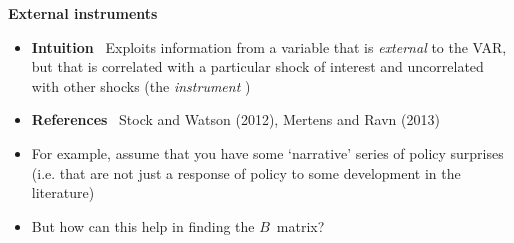 \begin{frame}
\vspace{3cm} \color{title}\bigskip

\color{note}
\end{frame}


\begin{frame}
{\textbf{External instruments}}\bigskip \smallskip

\begin{itemize}
\item \textbf{Intuition} \ Exploits information from a variable that is 
\emph{external} to the VAR, but that is correlated with a particular shock
of interest and uncorrelated with other shocks (the \emph{instrument}%
)\bigskip \medskip

\item \textbf{References} \ Stock and Watson (2012), Mertens and Ravn
(2013)\bigskip \medskip \pause

\item For example, assume that you have some `narrative' series of policy
surprises (i.e. that are not just a response of policy to some development
in the literature)\bigskip \medskip \pause

\item But how can this help in finding the $B$\ matrix?
\end{itemize}
\end{frame}


